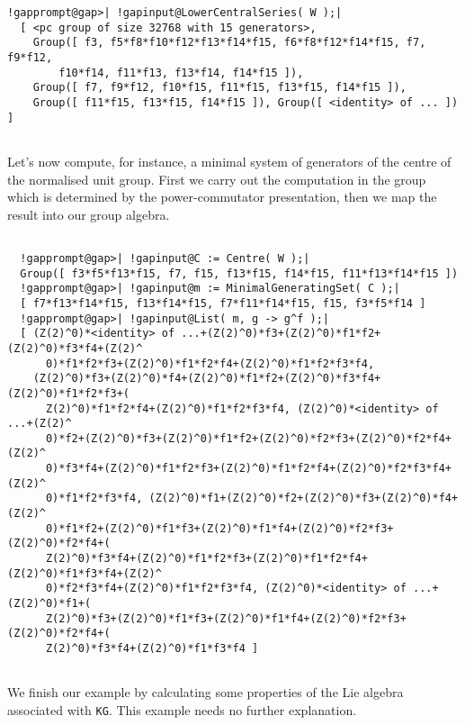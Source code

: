 \documentclass[a4paper,11pt]{report}
\begin{document}
{\begin{Verbatim}[commandchars=!@|,fontsize=\small,frame=single,label=Example]
  !gapprompt@gap>| !gapinput@LowerCentralSeries( W );|
  [ <pc group of size 32768 with 15 generators>,
    Group([ f3, f5*f8*f10*f12*f13*f14*f15, f6*f8*f12*f14*f15, f7, f9*f12,
        f10*f14, f11*f13, f13*f14, f14*f15 ]),
    Group([ f7, f9*f12, f10*f15, f11*f15, f13*f15, f14*f15 ]),
    Group([ f11*f15, f13*f15, f14*f15 ]), Group([ <identity> of ... ]) ]
  
\end{Verbatim}
 \newpage Let's now compute, for instance, a minimal system of generators of the centre
of the normalised unit group. First we carry out the computation in the group
which is determined by the power-commutator presentation, then we map the
result into our group algebra. 
\begin{Verbatim}[commandchars=!@|,fontsize=\small,frame=single,label=Example]
  
  !gapprompt@gap>| !gapinput@C := Centre( W );|
  Group([ f3*f5*f13*f15, f7, f15, f13*f15, f14*f15, f11*f13*f14*f15 ])
  !gapprompt@gap>| !gapinput@m := MinimalGeneratingSet( C );|
  [ f7*f13*f14*f15, f13*f14*f15, f7*f11*f14*f15, f15, f3*f5*f14 ]
  !gapprompt@gap>| !gapinput@List( m, g -> g^f );|
  [ (Z(2)^0)*<identity> of ...+(Z(2)^0)*f3+(Z(2)^0)*f1*f2+(Z(2)^0)*f3*f4+(Z(2)^
      0)*f1*f2*f3+(Z(2)^0)*f1*f2*f4+(Z(2)^0)*f1*f2*f3*f4,
    (Z(2)^0)*f3+(Z(2)^0)*f4+(Z(2)^0)*f1*f2+(Z(2)^0)*f3*f4+(Z(2)^0)*f1*f2*f3+(
      Z(2)^0)*f1*f2*f4+(Z(2)^0)*f1*f2*f3*f4, (Z(2)^0)*<identity> of ...+(Z(2)^
      0)*f2+(Z(2)^0)*f3+(Z(2)^0)*f1*f2+(Z(2)^0)*f2*f3+(Z(2)^0)*f2*f4+(Z(2)^
      0)*f3*f4+(Z(2)^0)*f1*f2*f3+(Z(2)^0)*f1*f2*f4+(Z(2)^0)*f2*f3*f4+(Z(2)^
      0)*f1*f2*f3*f4, (Z(2)^0)*f1+(Z(2)^0)*f2+(Z(2)^0)*f3+(Z(2)^0)*f4+(Z(2)^
      0)*f1*f2+(Z(2)^0)*f1*f3+(Z(2)^0)*f1*f4+(Z(2)^0)*f2*f3+(Z(2)^0)*f2*f4+(
      Z(2)^0)*f3*f4+(Z(2)^0)*f1*f2*f3+(Z(2)^0)*f1*f2*f4+(Z(2)^0)*f1*f3*f4+(Z(2)^
      0)*f2*f3*f4+(Z(2)^0)*f1*f2*f3*f4, (Z(2)^0)*<identity> of ...+(Z(2)^0)*f1+(
      Z(2)^0)*f3+(Z(2)^0)*f1*f3+(Z(2)^0)*f1*f4+(Z(2)^0)*f2*f3+(Z(2)^0)*f2*f4+(
      Z(2)^0)*f3*f4+(Z(2)^0)*f1*f3*f4 ]
  
\end{Verbatim}
 We finish our example by calculating some properties of the Lie algebra
associated with \texttt{KG}. This example needs no further explanation. 
\begin{Verbatim}[commandchars=!@|,fontsize=\small,frame=single,label=Example]
  

\end{Verbatim}}
\end{document}
